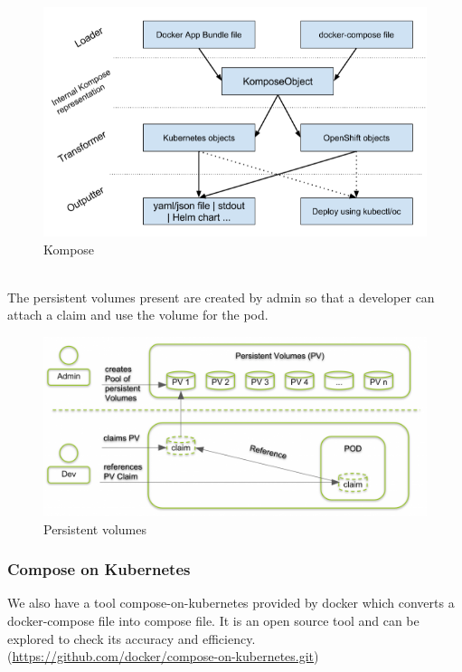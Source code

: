 \documentclass[12pt]{article}
\begin{document}
\begin{figure}[h!]
	\begin{center}
		\includegraphics[totalheight=0.38\textheight]{kompose}
		\caption{Kompose}
	\end{center}
\end{figure}
\\The persistent volumes present are created by admin so that a developer can attach a claim and use the volume for the pod.
\begin{figure}[h!]
	\begin{center}
		\includegraphics[totalheight=0.33\textheight]{persistentvolumes}
		\caption{Persistent volumes}
	\end{center}
\end{figure}
\subsubsection{Compose on Kubernetes}
We also have a tool compose-on-kubernetes provided by docker which converts a docker-compose file into compose file. It is an open source tool and can be explored to check its accuracy and efficiency.(\href{https://github.com/docker/compose-on-kubernetes.git}{https://github.com/docker/compose-on-kubernetes.git})
\end{document}
